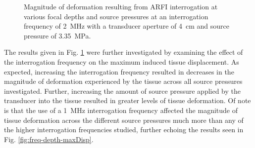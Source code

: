 			\begin{figure}[!htb]
				\centering
				\caption[ARFI-induced deformation at various depths and source pressures]{Magnitude of deformation resulting from ARFI interrogation at various focal depths and source pressures at an interrogation frequency of \SI{2}{\MHz} with a transducer aperture of \SI{4}{\cm} and source pressure of \SI{3.35}{\MPa}.}
				\label{fig:pressure_maxDisp}
			\end{figure}

			The results given in Fig. \ref{fig:pressure_maxDisp} were further investigated by examining the effect of the interrogation frequency on the maximum induced tissue displacement. As expected, increasing the interrogation frequency resulted in decreases in the magnitude of deformation experienced by the tissue across all source pressures investigated. Further, increasing the amount of source pressure applied by the transducer into the tissue resulted in greater levels of tissue deformation. Of note is that the use of a \SI{1}{\MHz} interrogation frequency affected the magnitude of tissue deformation across the different source pressures much more than any of the higher interrogation frequencies studied, further echoing the results seen in Fig. \ref{fig:freq-depth-maxDisp}.

